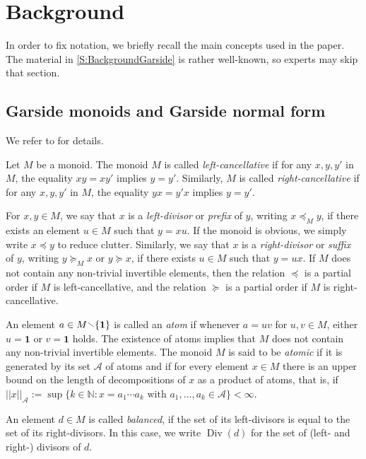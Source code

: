 \documentclass[a4paper,final]{article}
\theoremstyle{plain}
\theoremstyle{remark}
\theoremstyle{definition}
\begin{document}
\section{Background}\label{S:Background}

In order to fix notation, we briefly recall the main concepts used in the paper.
The material in \autoref{S:BackgroundGarside} is rather well-known, so experts may skip that section.

\subsection{Garside monoids and Garside normal form}\label{S:BackgroundGarside}

We refer to \cite{DehornoyParis99,Dehornoy02,GarsideBook} for details.

Let $M$ be a monoid.
The monoid $M$ is called \emph{left-cancellative} if for any $x,y,y'$ in $M$, the equality $xy = xy'$ implies $y = y'$.
Similarly, $M$ is called \emph{right-cancellative} if for any $x,y,y'$ in $M$, the equality $yx = y'x$ implies $y = y'$.

For $x,y\in M$, we say that $x$ is a \emph{left-divisor} or \emph{prefix} of $y$, writing $x {\preccurlyeq}_M y$, if there exists an element $u\in M$ such that $y = xu$.  If the monoid is obvious, we simply write $x {\preccurlyeq} y$ to reduce clutter.
Similarly, we say that $x$ is a \emph{right-divisor} or \emph{suffix} of $y$,
writing $y{\succcurlyeq}_M x$ or $y{\succcurlyeq} x$, if there exists $u\in M$ such that $y = ux$.
If $M$ does not contain any non-trivial invertible elements, then the relation ${\preccurlyeq}$ is a partial order if $M$ is left-cancellative, and the relation ${\succcurlyeq}$ is a partial order if $M$ is right-cancellative.

An element $a\in M{\mathbin{\raisebox{0.25ex}{$\smallsetminus$}}}\{{\mathbf{1}}\}$ is called an \emph{atom} if whenever $a = uv$ for $u,v\in M$, either $u = {\mathbf{1}}$ or $v = {\mathbf{1}}$ holds.  The existence of atoms implies that $M$ does not contain any non-trivial invertible elements.
The monoid $M$ is said to be
\emph{atomic} if it is generated by its set ${\mathcal{A}}$ of atoms and if for every
element $x\in M$ there is an upper bound on the length of
decompositions of $x$ as a product of atoms, that is, if
$||x||_{\mathcal{A}} := \sup\{ k\in{\mathbb{N}} : x=a_1\cdots a_k \text{ with }a_1,\ldots,a_k\in{\mathcal{A}} \} < \infty$.

An element $d\in M$ is called \emph{balanced}, if the set of its left-divisors is equal to the set of its right-divisors.  In this case, we write $\operatorname{Div}(d)$ for the set of (left- and right-) divisors of $d$.
\end{document}
